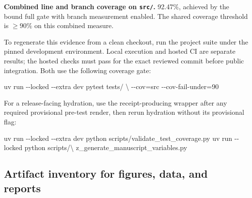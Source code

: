\documentclass[
  english,
]{article}
\newenvironment{Shaded}{}{}
\newcommand{\AttributeTok}[1]{\textcolor[rgb]{0.49,0.56,0.16}{#1}}
\newcommand{\DataTypeTok}[1]{\textcolor[rgb]{0.56,0.13,0.00}{#1}}
\newcommand{\ExtensionTok}[1]{#1}
\newcommand{\NormalTok}[1]{#1}
\newcommand{\OperatorTok}[1]{\textcolor[rgb]{0.40,0.40,0.40}{#1}}
\theoremstyle{plain}
\theoremstyle{definition}
\theoremstyle{remark}
\theoremstyle{definition}
\begin{document}
\textbf{Combined line and branch coverage on \texttt{src/}.} 92.47\%,
achieved by the bound full gate with branch measurement enabled. The
shared coverage threshold is \(\ge 90\%\) on this combined measure.

To regenerate this evidence from a clean checkout, run the project suite
under the pinned development environment. Local execution and hosted CI
are separate results; the hosted checks must pass for the exact reviewed
commit before public integration. Both use the following coverage gate:

\begin{Shaded}
\begin{Highlighting}[]
\ExtensionTok{uv}\NormalTok{ run }\AttributeTok{{-}{-}locked} \AttributeTok{{-}{-}extra}\NormalTok{ dev pytest tests/ }\DataTypeTok{\textbackslash{}}
  \AttributeTok{{-}{-}cov}\OperatorTok{=}\NormalTok{src }\AttributeTok{{-}{-}cov{-}fail{-}under}\OperatorTok{=}\NormalTok{90}
\end{Highlighting}
\end{Shaded}

For a release-facing hydration, use the receipt-producing wrapper after
any required provisional pre-test render, then rerun hydration without
its provisional flag:

\begin{Shaded}
\begin{Highlighting}[]
\ExtensionTok{uv}\NormalTok{ run }\AttributeTok{{-}{-}locked} \AttributeTok{{-}{-}extra}\NormalTok{ dev python scripts/validate\_test\_coverage.py}
\ExtensionTok{uv}\NormalTok{ run }\AttributeTok{{-}{-}locked}\NormalTok{ python scripts/}\DataTypeTok{\textbackslash{}}
\NormalTok{z\_generate\_manuscript\_variables.py}
\end{Highlighting}
\end{Shaded}

\subsection{Artifact inventory for figures, data, and
reports}\label{sec:repro-artifacts}
\end{document}

